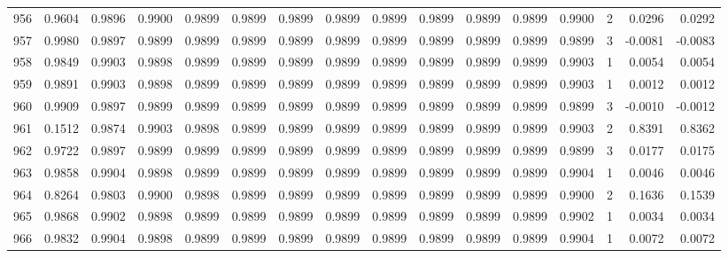 \begin{tabular}{lrrrrrrrrrrrrrrr}
956 &      0.9604 &  0.9896 &  0.9900 &  0.9899 &  0.9899 &  0.9899 &  0.9899 &  0.9899 &  0.9899 &  0.9899 &   0.9899 &     0.9900 &      2 &                    0.0296 &                     0.0292 \\
957 &      0.9980 &  0.9897 &  0.9899 &  0.9899 &  0.9899 &  0.9899 &  0.9899 &  0.9899 &  0.9899 &  0.9899 &   0.9899 &     0.9899 &      3 &                   -0.0081 &                    -0.0083 \\
958 &      0.9849 &  0.9903 &  0.9898 &  0.9899 &  0.9899 &  0.9899 &  0.9899 &  0.9899 &  0.9899 &  0.9899 &   0.9899 &     0.9903 &      1 &                    0.0054 &                     0.0054 \\
959 &      0.9891 &  0.9903 &  0.9898 &  0.9899 &  0.9899 &  0.9899 &  0.9899 &  0.9899 &  0.9899 &  0.9899 &   0.9899 &     0.9903 &      1 &                    0.0012 &                     0.0012 \\
960 &      0.9909 &  0.9897 &  0.9899 &  0.9899 &  0.9899 &  0.9899 &  0.9899 &  0.9899 &  0.9899 &  0.9899 &   0.9899 &     0.9899 &      3 &                   -0.0010 &                    -0.0012 \\
961 &      0.1512 &  0.9874 &  0.9903 &  0.9898 &  0.9899 &  0.9899 &  0.9899 &  0.9899 &  0.9899 &  0.9899 &   0.9899 &     0.9903 &      2 &                    0.8391 &                     0.8362 \\
962 &      0.9722 &  0.9897 &  0.9899 &  0.9899 &  0.9899 &  0.9899 &  0.9899 &  0.9899 &  0.9899 &  0.9899 &   0.9899 &     0.9899 &      3 &                    0.0177 &                     0.0175 \\
963 &      0.9858 &  0.9904 &  0.9898 &  0.9899 &  0.9899 &  0.9899 &  0.9899 &  0.9899 &  0.9899 &  0.9899 &   0.9899 &     0.9904 &      1 &                    0.0046 &                     0.0046 \\
964 &      0.8264 &  0.9803 &  0.9900 &  0.9898 &  0.9899 &  0.9899 &  0.9899 &  0.9899 &  0.9899 &  0.9899 &   0.9899 &     0.9900 &      2 &                    0.1636 &                     0.1539 \\
965 &      0.9868 &  0.9902 &  0.9898 &  0.9899 &  0.9899 &  0.9899 &  0.9899 &  0.9899 &  0.9899 &  0.9899 &   0.9899 &     0.9902 &      1 &                    0.0034 &                     0.0034 \\
966 &      0.9832 &  0.9904 &  0.9898 &  0.9899 &  0.9899 &  0.9899 &  0.9899 &  0.9899 &  0.9899 &  0.9899 &   0.9899 &     0.9904 &      1 &                    0.0072 &                     0.0072 \\

\end{tabular}
